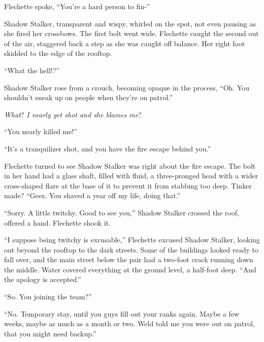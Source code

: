 





Flechette spoke, ``You're a hard person to fin-''



Shadow Stalker, transparent and wispy, whirled on the spot, not even pausing as she fired her crossbows.  The first bolt went wide.  Flechette caught the second out of the air, staggered back a step as she was caught off balance.  Her right foot skidded to the edge of the rooftop.



``What the hell!?''



Shadow Stalker rose from a crouch, becoming opaque in the process, ``Oh.  You shouldn't sneak up on people when they're on patrol.''



\emph{What}?  \emph{I nearly get shot and she blames me}?



``You nearly killed me!''



``It's a tranquilizer shot, and you have the fire escape behind you.''



Flechette turned to see Shadow Stalker was right about the fire escape.  The bolt in her hand had a glass shaft, filled with fluid, a three-pronged head with a wider cross-shaped flare at the base of it to prevent it from stabbing too deep.  Tinker made?  ``Geez.  You shaved a year off my life, doing that.''



``Sorry.  A little twitchy.  Good to see you,''  Shadow Stalker crossed the roof, offered a hand.  Flechette shook it.



``I suppose being twitchy is excusable,'' Flechette excused Shadow Stalker, looking out beyond the rooftop to the dark streets.  Some of the buildings looked ready to fall over, and the main street below the pair had a two-foot crack running down the middle.  Water covered everything at the ground level, a half-foot deep.  ``And the apology is accepted.''



``So.  You joining the team?''



``No.  Temporary stay, until you guys fill out your ranks again.  Maybe a few weeks, maybe as much as a month or two.  Weld told me you were out on patrol, that you might need backup.''



